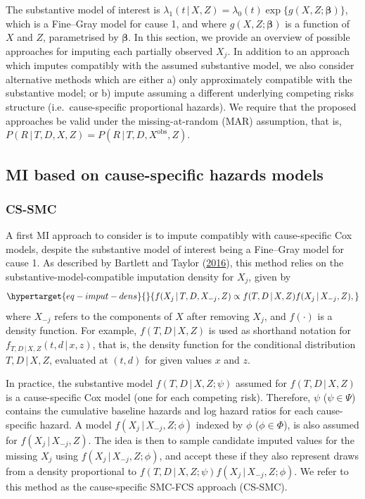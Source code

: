 \documentclass[
  letterpaper,
  DIV=11,
  numbers=noendperiod]{scrreprt}
\newcommand{\given}{\,|\,}
\begin{document}
The substantive model of interest is
\(\lambda_1(t \given X, Z) = \lambda_{0}(t)\exp\{g(X,Z;\boldsymbol{\beta})\}\),
which is a Fine--Gray model for cause 1, and where
\(g(X,Z;\boldsymbol{\beta})\) is a function of \(X\) and \(Z\),
parametrised by \(\boldsymbol{\beta}\). In this section, we provide an
overview of possible approaches for imputing each partially observed
\(X_j\). In addition to an approach which imputes compatibly with the
assumed substantive model, we also consider alternative methods which
are either a) only approximately compatible with the substantive model;
or b) impute assuming a different underlying competing risks structure
(i.e.~cause-specific proportional hazards). We require that the proposed
approaches be valid under the missing-at-random (MAR) assumption, that
is, \(P(R \given T, D, X, Z) = P(R \given T, D, X^{\text{obs}}, Z)\).

\hypertarget{mi-based-on-cause-specific-hazards-models}{%
\subsection{MI based on cause-specific hazards
models}\label{mi-based-on-cause-specific-hazards-models}}

\hypertarget{sec-cs-smc}{%
\subsubsection{CS-SMC}\label{sec-cs-smc}}

A first MI approach to consider is to impute compatibly with
cause-specific Cox models, despite the substantive model of interest
being a Fine--Gray model for cause 1. As described by Bartlett and
Taylor
(\protect\hyperlink{ref-bartlettMissingCovariatesCompeting2016}{2016}),
this method relies on the substantive-model-compatible imputation
density for \(X_j\), given by
\begin{equation}\protect\hypertarget{eq-imput-dens}{}{
f(X_j \given T, D, X_{-j}, Z) \propto f(T, D \given X, Z)f(X_j \given X_{-j},Z),
}\label{eq-imput-dens}\end{equation} where \(X_{-j}\) refers to the
components of \(X\) after removing \(X_j\), and \(f(\cdot)\) is a
density function. For example, \(f(T, D \given X, Z)\) is used as
shorthand notation for \(f_{T, D \given X, Z}(t, d \given x,z)\), that
is, the density function for the conditional distribution
\(T, D \given X, Z\), evaluated at \((t,d)\) for given values \(x\) and
\(z\).

\sloppy In practice, the substantive model \(f(T, D \given X, Z;\psi)\)
assumed for \(f(T, D \given X, Z)\) is a cause-specific Cox model (one
for each competing risk). Therefore, \(\psi\) (\(\psi \in \Psi\))
contains the cumulative baseline hazards and log hazard ratios for each
cause-specific hazard. A model \(f(X_j \given X_{-j},Z;\phi)\) indexed
by \(\phi\) (\(\phi \in \Phi\)), is also assumed for
\(f(X_j \given X_{-j},Z)\). The idea is then to sample candidate imputed
values for the missing \(X_j\) using \(f(X_j \given X_{-j},Z;\phi)\),
and accept these if they also represent draws from a density
proportional to \(f(T, D \given X, Z;\psi)f(X_j \given X_{-j},Z;\phi)\).
We refer to this method as the cause-specific SMC-FCS approach (CS-SMC).
\end{document}
